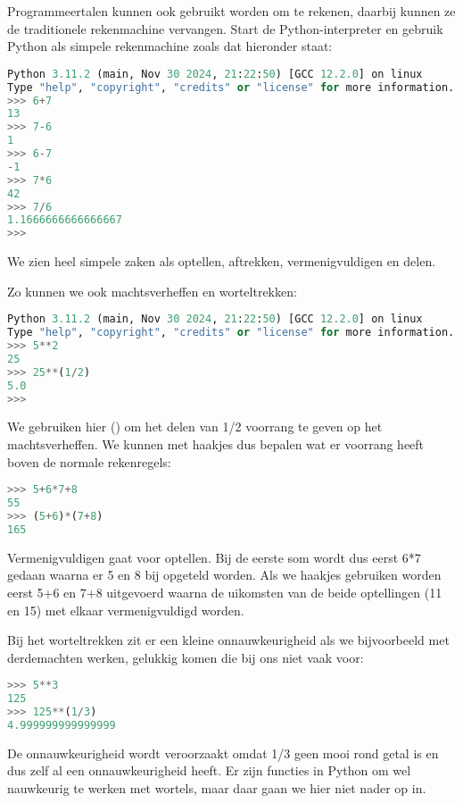Programmeertalen kunnen ook gebruikt worden om te rekenen, daarbij kunnen ze de traditionele rekenmachine vervangen. Start de Python-interpreter en gebruik Python als simpele rekenmachine zoals dat hieronder staat:
\begin{lstlisting}[language=Python]
Python 3.11.2 (main, Nov 30 2024, 21:22:50) [GCC 12.2.0] on linux
Type "help", "copyright", "credits" or "license" for more information.
>>> 6+7
13
>>> 7-6
1
>>> 6-7
-1
>>> 7*6
42
>>> 7/6
1.1666666666666667
>>> 
\end{lstlisting}
We zien heel simpele zaken als optellen, aftrekken, vermenigvuldigen en delen.

Zo kunnen we ook machtsverheffen en worteltrekken:
\begin{lstlisting}[language=Python]
Python 3.11.2 (main, Nov 30 2024, 21:22:50) [GCC 12.2.0] on linux
Type "help", "copyright", "credits" or "license" for more information.
>>> 5**2
25
>>> 25**(1/2)
5.0
>>>
\end{lstlisting}

We gebruiken hier () om het delen van 1/2 voorrang te geven op het machtsverheffen. We kunnen met haakjes dus bepalen wat er voorrang heeft boven de normale rekenregels:
\begin{lstlisting}[language=Python]
>>> 5+6*7+8
55
>>> (5+6)*(7+8)
165
\end{lstlisting}
Vermenigvuldigen gaat voor optellen. Bij de eerste som wordt dus eerst 6*7 gedaan waarna er 5 en 8 bij opgeteld worden. Als we haakjes gebruiken worden eerst 5+6 en 7+8 uitgevoerd waarna de uikomsten van de beide optellingen (11 en 15) met elkaar vermenigvuldigd worden.

Bij het worteltrekken zit er een kleine onnauwkeurigheid als we bijvoorbeeld met derdemachten werken, gelukkig komen die bij ons niet vaak voor:
\begin{lstlisting}[language=Python]
>>> 5**3
125
>>> 125**(1/3)
4.999999999999999
\end{lstlisting}
De onnauwkeurigheid wordt veroorzaakt omdat 1/3 geen mooi rond getal is en dus zelf al een onnauwkeurigheid heeft. Er zijn functies in Python om wel nauwkeurig te werken met wortels, maar daar gaan we hier niet nader op in.

